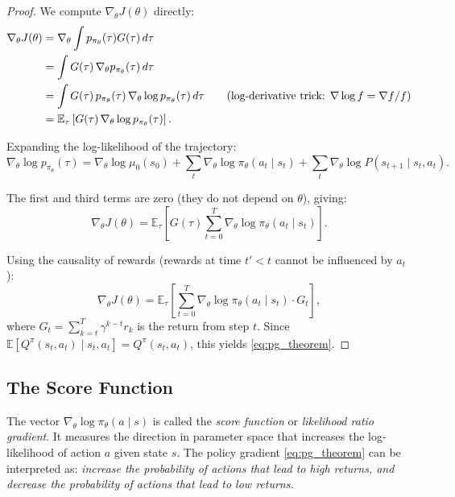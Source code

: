 \documentclass[11pt, a4paper]{article}
\newcommand{\E}{\mathbb{E}}
\newcommand{\grad}{\nabla}
\begin{document}
\begin{proof}
We compute $\grad_\theta J(\theta)$ directly:
\begin{align}
    \grad_\theta J(\theta)
    &= \grad_\theta \int p_{\pi_\theta}(\tau) G(\tau) \, d\tau \notag\\
    &= \int G(\tau) \, \grad_\theta p_{\pi_\theta}(\tau) \, d\tau \notag\\
    &= \int G(\tau) \, p_{\pi_\theta}(\tau) \, \grad_\theta \log p_{\pi_\theta}(\tau) \, d\tau
    \tag{log-derivative trick: $\grad \log f = \grad f / f$}\\
    &= \E_\tau \left[ G(\tau) \, \grad_\theta \log p_{\pi_\theta}(\tau) \right].
\end{align}

Expanding the log-likelihood of the trajectory:
\begin{equation}
    \grad_\theta \log p_{\pi_\theta}(\tau)
    = \grad_\theta \log \mu_0(s_0)
    + \sum_{t} \grad_\theta \log \pi_\theta(a_t \mid s_t)
    + \sum_t \grad_\theta \log P(s_{t+1} \mid s_t, a_t).
\end{equation}

The first and third terms are zero (they do not depend on $\theta$), giving:
\begin{equation}
    \grad_\theta J(\theta) = \E_\tau \left[ G(\tau) \sum_{t=0}^{T} \grad_\theta \log \pi_\theta(a_t \mid s_t) \right].
\end{equation}

Using the causality of rewards (rewards at time $t' < t$ cannot be influenced by $a_t$):
\begin{equation}
    \grad_\theta J(\theta) = \E_\tau \left[
        \sum_{t=0}^{T} \grad_\theta \log \pi_\theta(a_t \mid s_t) \cdot G_t
    \right],
\end{equation}
where $G_t = \sum_{k=t}^{T} \gamma^{k-t} r_k$ is the return from step $t$.
Since $\E[Q^\pi(s_t, a_t) \mid s_t, a_t] = Q^\pi(s_t, a_t)$, this yields \eqref{eq:pg_theorem}.
\end{proof}

\subsection{The Score Function}

The vector $\grad_\theta \log \pi_\theta(a \mid s)$ is called the \emph{score function}
or \emph{likelihood ratio gradient}.
It measures the direction in parameter space that increases the log-likelihood
of action $a$ given state $s$.
The policy gradient \eqref{eq:pg_theorem} can be interpreted as:
\emph{increase the probability of actions that lead to high returns, and decrease
the probability of actions that lead to low returns.}
\end{document}
